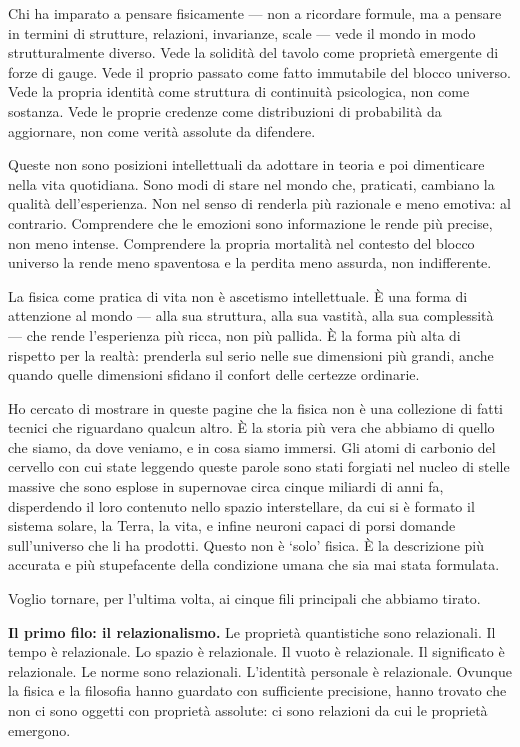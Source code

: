 \documentclass[12pt,a4paper,openany]{book}
\begin{document}
\medskip

Chi ha imparato a pensare fisicamente --- non a ricordare formule, ma a pensare in termini di strutture, relazioni, invarianze, scale --- vede il mondo in modo strutturalmente diverso. Vede la solidità del tavolo come proprietà emergente di forze di gauge. Vede il proprio passato come fatto immutabile del blocco universo. Vede la propria identità come struttura di continuità psicologica, non come sostanza. Vede le proprie credenze come distribuzioni di probabilità da aggiornare, non come verità assolute da difendere.

Queste non sono posizioni intellettuali da adottare in teoria e poi dimenticare nella vita quotidiana. Sono modi di stare nel mondo che, praticati, cambiano la qualità dell'esperienza. Non nel senso di renderla più razionale e meno emotiva: al contrario. Comprendere che le emozioni sono informazione le rende più precise, non meno intense. Comprendere la propria mortalità nel contesto del blocco universo la rende meno spaventosa e la perdita meno assurda, non indifferente.

La fisica come pratica di vita non è ascetismo intellettuale. È una forma di attenzione al mondo --- alla sua struttura, alla sua vastità, alla sua complessità --- che rende l'esperienza più ricca, non più pallida. È la forma più alta di rispetto per la realtà: prenderla sul serio nelle sue dimensioni più grandi, anche quando quelle dimensioni sfidano il confort delle certezze ordinarie.

Ho cercato di mostrare in queste pagine che la fisica non è una collezione di fatti tecnici che riguardano qualcun altro. È la storia più vera che abbiamo di quello che siamo, da dove veniamo, e in cosa siamo immersi. Gli atomi di carbonio del cervello con cui state leggendo queste parole sono stati forgiati nel nucleo di stelle massive che sono esplose in supernovae circa cinque miliardi di anni fa, disperdendo il loro contenuto nello spazio interstellare, da cui si è formato il sistema solare, la Terra, la vita, e infine neuroni capaci di porsi domande sull'universo che li ha prodotti. Questo non è `solo' fisica. È la descrizione più accurata e più stupefacente della condizione umana che sia mai stata formulata.

\medskip

Voglio tornare, per l'ultima volta, ai cinque fili principali che abbiamo tirato.

\textbf{Il primo filo: il relazionalismo.} Le proprietà quantistiche sono relazionali. Il tempo è relazionale. Lo spazio è relazionale. Il vuoto è relazionale. Il significato è relazionale. Le norme sono relazionali. L'identità personale è relazionale. Ovunque la fisica e la filosofia hanno guardato con sufficiente precisione, hanno trovato che non ci sono oggetti con proprietà assolute: ci sono relazioni da cui le proprietà emergono.
\end{document}
